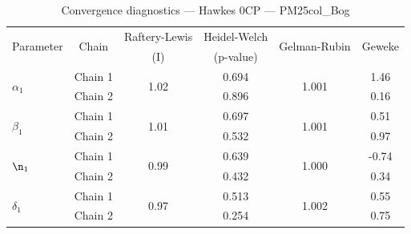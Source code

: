 \begin{table}[H]
\centering
\caption{Convergence diagnostics — Hawkes 0CP — PM25col_Bog}
\begin{tabular}{lccccc}
\toprule
\multirow{2}{*}{Parameter} & \multirow{2}{*}{Chain} & Raftery-Lewis & Heidel-Welch & \multirow{2}{*}{Gelman-Rubin} & \multirow{2}{*}{Geweke} \\
 & & (I) & (p-value) & & (z) \\
\midrule
\multirow{2}{*}{$\alpha_1$} & Chain 1 & \multirow{2}{*}{1.02} & 0.694 & \multirow{2}{*}{1.001} & 1.46 \\
 & Chain 2 & & 0.896 & & 0.16 \\
\midrule
\multirow{2}{*}{$\beta_1$} & Chain 1 & \multirow{2}{*}{1.01} & 0.697 & \multirow{2}{*}{1.001} & 0.51 \\
 & Chain 2 & & 0.532 & & 0.97 \\
\midrule
\multirow{2}{*}{$\n_1$} & Chain 1 & \multirow{2}{*}{0.99} & 0.639 & \multirow{2}{*}{1.000} & -0.74 \\
 & Chain 2 & & 0.432 & & 0.34 \\
\midrule
\multirow{2}{*}{$\delta_1$} & Chain 1 & \multirow{2}{*}{0.97} & 0.513 & \multirow{2}{*}{1.002} & 0.55 \\
 & Chain 2 & & 0.254 & & 0.75 \\
\bottomrule
\end{tabular}
\end{table}
